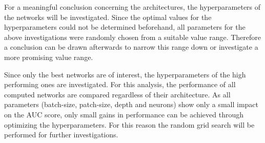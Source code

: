 For a meaningful conclusion concerning the architectures, the hyperparameters of the networks will be investigated.
Since the optimal values for the hyperparameters could not be determined beforehand,
all parameters for the above investigations were randomly chosen from a suitable value range.
Therefore a conclusion can be drawn afterwards to narrow this range down or investigate a more promising value range.

Since only the best networks are of interest, the hyperparameters of the high performing ones are investigated.
For this analysis, the performance of all computed networks are compared regardless of their architecture.
As all parameters (batch-size, patch-size, depth and neurons) show only a small impact on the AUC score,
only small gains in performance can be achieved through optimizing the hyperparameters.
For this reason the random grid search will be performed for further investigations.


